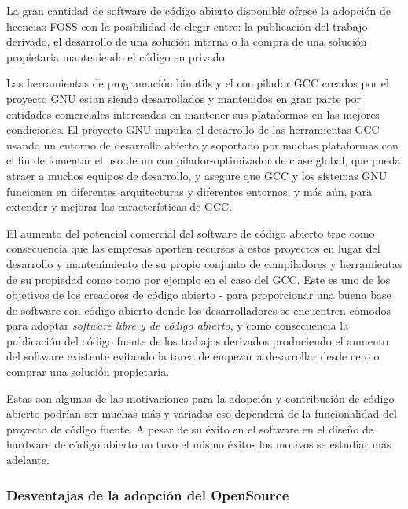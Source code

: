 	La gran cantidad de software de código abierto disponible ofrece la adopción de licencias FOSS con la posibilidad de elegir entre: la publicación del trabajo derivado, el desarrollo de una solución interna o la compra de una solución propietaria manteniendo el código en privado.


	Las herramientas de programación binutils y el compilador GCC creados por el proyecto GNU estan siendo desarrollados y mantenidos en gran parte por entidades 			comerciales interesadas en mantener sus plataformas en las mejores condiciones. El proyecto GNU impulsa el desarrollo de las herramientas GCC usando un entorno de 				desarrollo abierto y soportado por muchas plataformas con el fin de fomentar el uso de un compilador-optimizador de clase global, que pueda atraer a muchos equipos de 				desarrollo, y asegure que GCC y los sistemas GNU funcionen en diferentes arquitecturas y diferentes entornos, y más aún, para extender y mejorar las características de GCC. 

	El aumento del potencial comercial del software de código abierto trae como consecuencia que las empresas aporten recursos a estos proyectos en lugar del desarrollo y 				mantenimiento de su propio conjunto de compiladores y herramientas de su propiedad como como por ejemplo en el caso del GCC. Este es uno de los objetivos de los creadores 	de código abierto - para proporcionar una buena base de software con código abierto donde los desarrolladores se encuentren cómodos para adoptar  \textit{software libre y de 		código abierto}, y como consecuencia la publicación del código fuente de los trabajos derivados
	produciendo el aumento del software existente evitando la tarea de empezar a desarrollar desde cero o comprar una solución propietaria. 

	 Estas son algunas de las motivaciones para la adopción y contribución de código abierto podrían ser muchas más y variadas eso dependerá de la funcionalidad del proyecto de código fuente. A pesar de su éxito en el software en el diseño de hardware de código abierto  no tuvo el mismo éxitos los motivos se estudiar más adelante.

\subsubsection{Desventajas de la adopción del OpenSource}


